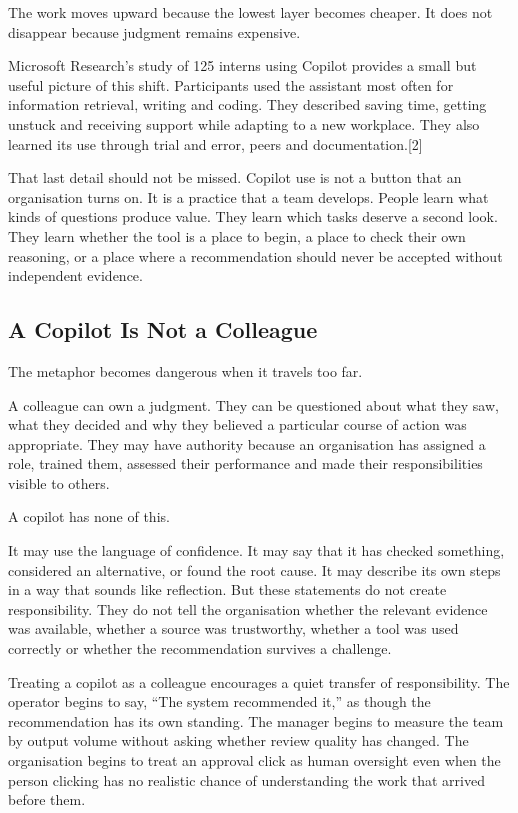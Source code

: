 The work moves upward because the lowest layer becomes cheaper. It does
not disappear because judgment remains expensive.

Microsoft Research's study of 125 interns using Copilot provides a small
but useful picture of this shift. Participants used the assistant most
often for information retrieval, writing and coding. They described
saving time, getting unstuck and receiving support while adapting to a
new workplace. They also learned its use through trial and error, peers
and documentation.{[}2{]}

That last detail should not be missed. Copilot use is not a button that
an organisation turns on. It is a practice that a team develops. People
learn what kinds of questions produce value. They learn which tasks
deserve a second look. They learn whether the tool is a place to begin,
a place to check their own reasoning, or a place where a recommendation
should never be accepted without independent evidence.

\subsection{A Copilot Is Not a
Colleague}\label{a-copilot-is-not-a-colleague}

The metaphor becomes dangerous when it travels too far.

A colleague can own a judgment. They can be questioned about what they
saw, what they decided and why they believed a particular course of
action was appropriate. They may have authority because an organisation
has assigned a role, trained them, assessed their performance and made
their responsibilities visible to others.

A copilot has none of this.

It may use the language of confidence. It may say that it has checked
something, considered an alternative, or found the root cause. It may
describe its own steps in a way that sounds like reflection. But these
statements do not create responsibility. They do not tell the
organisation whether the relevant evidence was available, whether a
source was trustworthy, whether a tool was used correctly or whether the
recommendation survives a challenge.

Treating a copilot as a colleague encourages a quiet transfer of
responsibility. The operator begins to say, ``The system recommended
it,'' as though the recommendation has its own standing. The manager
begins to measure the team by output volume without asking whether
review quality has changed. The organisation begins to treat an approval
click as human oversight even when the person clicking has no realistic
chance of understanding the work that arrived before them.

